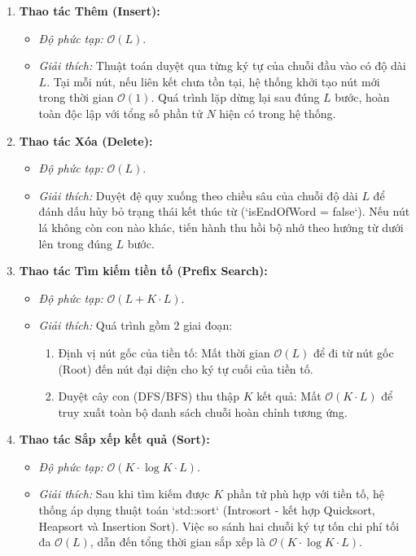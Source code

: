 \documentclass[12pt,a4paper]{report}
\begin{document}
\begin{enumerate}
    \item \textbf{Thao tác Thêm (Insert):}
    \begin{itemize}
        \item \textit{Độ phức tạp:} $\mathcal{O}(L)$.
        \item \textit{Giải thích:} Thuật toán duyệt qua từng ký tự của chuỗi đầu vào có độ dài $L$. Tại mỗi nút, nếu liên kết chưa tồn tại, hệ thống khởi tạo nút mới trong thời gian $\mathcal{O}(1)$. Quá trình lặp dừng lại sau đúng $L$ bước, hoàn toàn độc lập với tổng số phần tử $N$ hiện có trong hệ thống.
    \end{itemize}

    \item \textbf{Thao tác Xóa (Delete):}
    \begin{itemize}
        \item \textit{Độ phức tạp:} $\mathcal{O}(L)$.
        \item \textit{Giải thích:} Duyệt đệ quy xuống theo chiều sâu của chuỗi độ dài $L$ để đánh dấu hủy bỏ trạng thái kết thúc từ (`isEndOfWord = false`). Nếu nút lá không còn con nào khác, tiến hành thu hồi bộ nhớ theo hướng từ dưới lên trong đúng $L$ bước.
    \end{itemize}

    \item \textbf{Thao tác Tìm kiếm tiền tố (Prefix Search):}
    \begin{itemize}
        \item \textit{Độ phức tạp:} $\mathcal{O}(L + K \cdot L)$.
        \item \textit{Giải thích:} Quá trình gồm 2 giai đoạn:
        \begin{enumerate}
            \item Định vị nút gốc của tiền tố: Mất thời gian $\mathcal{O}(L)$ để đi từ nút gốc (Root) đến nút đại diện cho ký tự cuối của tiền tố.
            \item Duyệt cây con (DFS/BFS) thu thập $K$ kết quả: Mất $\mathcal{O}(K \cdot L)$ để truy xuất toàn bộ danh sách chuỗi hoàn chỉnh tương ứng.
        \end{enumerate}
    \end{itemize}

    \item \textbf{Thao tác Sắp xếp kết quả (Sort):}
    \begin{itemize}
        \item \textit{Độ phức tạp:} $\mathcal{O}(K \cdot \log K \cdot L)$.
        \item \textit{Giải thích:} Sau khi tìm kiếm được $K$ phần tử phù hợp với tiền tố, hệ thống áp dụng thuật toán `std::sort` (Introsort - kết hợp Quicksort, Heapsort và Insertion Sort). Việc so sánh hai chuỗi ký tự tốn chi phí tối đa $\mathcal{O}(L)$, dẫn đến tổng thời gian sắp xếp là $\mathcal{O}(K \cdot \log K \cdot L)$.
    \end{itemize}
\end{enumerate}
\end{document}
